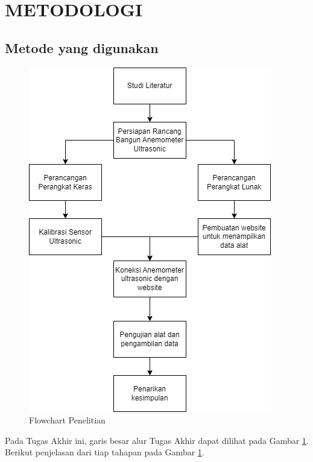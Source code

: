 \section{METODOLOGI}


\subsection{Metode yang digunakan}

\begin{figure}[h!]
	\centering
	\includegraphics[width=0.4\linewidth]{"gambar/Flowchart penelitian.drawio"}
	\caption{Flowchart Penelitian}
	\label{fig:flowchart-penelitian}
\end{figure}

Pada Tugas Akhir ini, garis besar alur Tugas Akhir dapat dilihat pada Gambar \ref*{fig:flowchart-penelitian}. Berikut penjelasan
dari tiap tahapan pada Gambar \ref{fig:flowchart-penelitian}.

